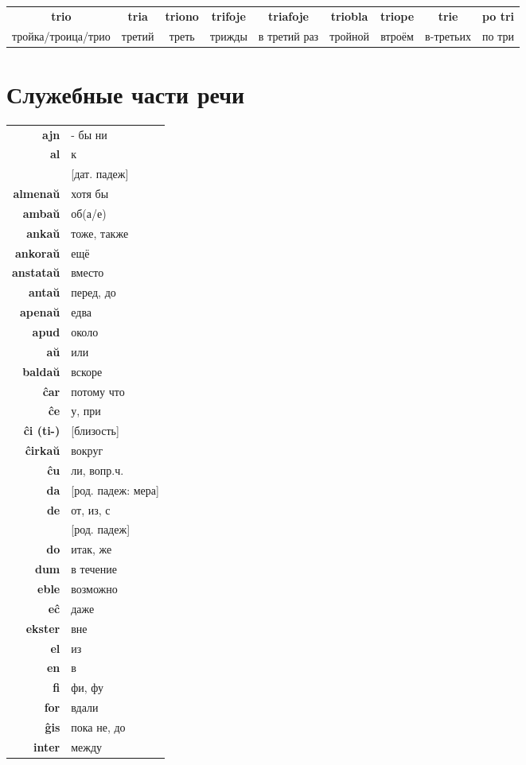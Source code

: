 \documentclass{article}
\def\b#1{\textbf{#1}}
\begin{document}
\begin{tabular}{ccccccccc}
\b{trio} & \b{tria} & \b{triono} & \b{trifoje} & \b{triafoje} & \b{triobla} & \b{triope} & \b{trie} & \b{po tri} \\
тройка/троица/трио & третий & треть & трижды & в третий раз & тройной & втроём  & в-третьих & по три \\ 
\end{tabular}

\section{Служебные части речи}

\begin{tabular}{>{\bfseries}rl}
ajn & - бы ни \\
al & к \\
~ & {}[дат. падеж] \\
almenaŭ & хотя бы \\
ambaŭ & об(а/е) \\
ankaŭ & тоже, также \\
ankoraŭ & ещё \\
anstataŭ & вместо \\
antaŭ & перед, до \\
apenaŭ & едва \\
apud & около \\
aŭ & или \\
baldaŭ & вскоре \\
ĉar & потому что \\
ĉe & у, при \\
ĉi (ti-) & {}[близость] \\
ĉirkaŭ & вокруг \\
ĉu & ли, вопр.ч. \\
da & {}[род. падеж: мера] \\
de & от, из, с \\
~ & {}[род. падеж] \\
do & итак, же \\
dum & в течение \\
eble & возможно \\
eĉ & даже \\
ekster & вне \\
el & из \\
en & в \\
fi & фи, фу \\
for & вдали \\
ĝis & пока не, до \\
inter & между \\

\end{tabular}
\end{document}
